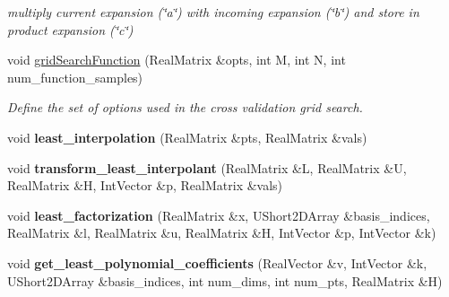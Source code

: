 \begin{DoxyCompactItemize}
\begin{DoxyCompactList}\small\item\em multiply current expansion (\char`\"{}a\char`\"{}) with incoming expansion (\char`\"{}b\char`\"{}) and store in product expansion (\char`\"{}c\char`\"{}) \end{DoxyCompactList}\item 
void \hyperlink{classPecos_1_1RegressOrthogPolyApproximation_a20995a034f76fb927a5b19f33120ff87}{grid\+Search\+Function} (Real\+Matrix \&opts, int M, int N, int num\+\_\+function\+\_\+samples)
\begin{DoxyCompactList}\small\item\em Define the set of options used in the cross validation grid search. \end{DoxyCompactList}\item 
void {\bfseries least\+\_\+interpolation} (Real\+Matrix \&pts, Real\+Matrix \&vals)\label{classPecos_1_1RegressOrthogPolyApproximation_a737d974b67a766de61e52d22548c5493}

\item 
void {\bfseries transform\+\_\+least\+\_\+interpolant} (Real\+Matrix \&L, Real\+Matrix \&U, Real\+Matrix \&H, Int\+Vector \&p, Real\+Matrix \&vals)\label{classPecos_1_1RegressOrthogPolyApproximation_a4415d293fb3edd38dfb94bd2a8526688}

\item 
void {\bfseries least\+\_\+factorization} (Real\+Matrix \&x, U\+Short2\+D\+Array \&basis\+\_\+indices, Real\+Matrix \&l, Real\+Matrix \&u, Real\+Matrix \&H, Int\+Vector \&p, Int\+Vector \&k)\label{classPecos_1_1RegressOrthogPolyApproximation_a98194a26a6ef44fc22f57ac878f1db9d}

\item 
void {\bfseries get\+\_\+least\+\_\+polynomial\+\_\+coefficients} (Real\+Vector \&v, Int\+Vector \&k, U\+Short2\+D\+Array \&basis\+\_\+indices, int num\+\_\+dims, int num\+\_\+pts, Real\+Matrix \&H)\label{classPecos_1_1RegressOrthogPolyApproximation_ac53b83c9fa44b84d7d80c4891b880145}

\end{DoxyCompactItemize}
